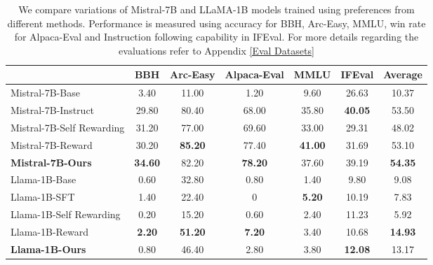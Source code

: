 \begin{table*}[h!]
\centering
{}

\begin{tabular}{l | ccccc|c}
\hline
\rowcolor{apricot} 
\multirow{0}{*}{Models} & BBH & Arc-Easy & Alpaca-Eval & MMLU & IFEval & Average \\ \hline

\rowcolor{lightgray} Mistral-7B-Base & 3.40 & 11.00 & 1.20 & 9.60 & 26.63 & 10.37\\ \hline
Mistral-7B-Instruct & 29.80 & 80.40 & 68.00 & 35.80 & \textbf{40.05} & 53.50\\ \hline
\rowcolor{lightgray} Mistral-7B-Self Rewarding & 31.20 & 77.00 & 69.60 & 33.00 & 29.31 & 48.02\\ \hline
Mistral-7B-Reward & 30.20 & \textbf{85.20} & 77.40 &\textbf{41.00} & 31.69 & 53.10\\ \hline
\rowcolor{lightgray}\textbf{Mistral-7B-Ours} & \textbf{34.60} & 82.20 & \textbf{78.20} & 37.60 & 39.19 & \textbf{54.35}\\ \hline

\hline \hline

\rowcolor{lightgray} Llama-1B-Base & 0.60 & 32.80 & 0.80 & 1.40 & 9.80 & 9.08\\ \hline 
Llama-1B-SFT & 1.40 & 22.40 & 0 & \textbf{5.20} & 10.19 & 7.83\\ \hline 
\rowcolor{lightgray} Llama-1B-Self Rewarding & 0.20 & 15.20 & 0.60 & 2.40 & 11.23 & 5.92\\ \hline
Llama-1B-Reward & \textbf{2.20} & \textbf{51.20} & \textbf{7.20} & 3.40 & 10.68 & \textbf{14.93}\\ \hline
\rowcolor{lightgray} \textbf{Llama-1B-Ours} & 0.80 & 46.40 & 2.80 & 3.80 & \textbf{12.08} & 13.17\\ \hline


\end{tabular}
\caption{We compare variations of Mistral-7B and LLaMA-1B models trained using preferences from different methods. Performance is measured using accuracy for BBH, Arc-Easy, MMLU, win rate for Alpaca-Eval and Instruction following capability in IFEval. For more details regarding the evaluations refer to Appendix \ref{Eval Datasets}
}
\label{tab:benchmark_comparison}
\end{table*}
